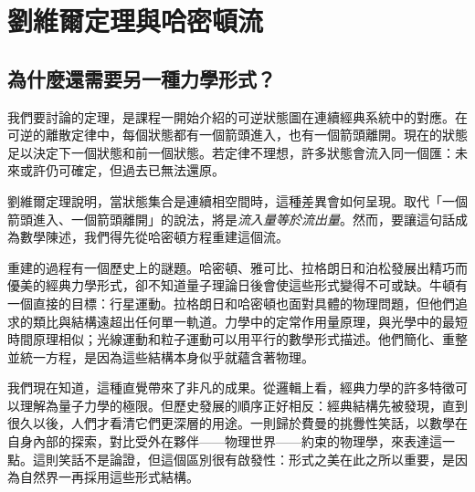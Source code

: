 \chapter{劉維爾定理與哈密頓流}


\section{為什麼還需要另一種力學形式？}

我們要討論的定理，是課程一開始介紹的可逆狀態圖在連續經典系統中的對應。在可逆的離散定律中，每個狀態都有一個箭頭進入，也有一個箭頭離開。現在的狀態足以決定下一個狀態和前一個狀態。若定律不理想，許多狀態會流入同一個匯：未來或許仍可確定，但過去已無法還原。

劉維爾定理說明，當狀態集合是連續相空間時，這種差異會如何呈現。取代「一個箭頭進入、一個箭頭離開」的說法，將是\emph{流入量等於流出量}。然而，要讓這句話成為數學陳述，我們得先從哈密頓方程重建這個流。

重建的過程有一個歷史上的謎題。哈密頓、雅可比、拉格朗日和泊松發展出精巧而優美的經典力學形式，卻不知道量子理論日後會使這些形式變得不可或缺。牛頓有一個直接的目標：行星運動。拉格朗日和哈密頓也面對具體的物理問題，但他們追求的類比與結構遠超出任何單一軌道。力學中的定常作用量原理，與光學中的最短時間原理相似；光線運動和粒子運動可以用平行的數學形式描述。他們簡化、重整並統一方程，是因為這些結構本身似乎就蘊含著物理。

我們現在知道，這種直覺帶來了非凡的成果。從邏輯上看，經典力學的許多特徵可以理解為量子力學的極限。但歷史發展的順序正好相反：經典結構先被發現，直到很久以後，人們才看清它們更深層的用途。一則歸於費曼的挑釁性笑話，以數學在自身內部的探索，對比受外在夥伴——物理世界——約束的物理學，來表達這一點。這則笑話不是論證，但這個區別很有啟發性：形式之美在此之所以重要，是因為自然界一再採用這些形式結構。

\begin{classroomqa}
\end{classroomqa}

